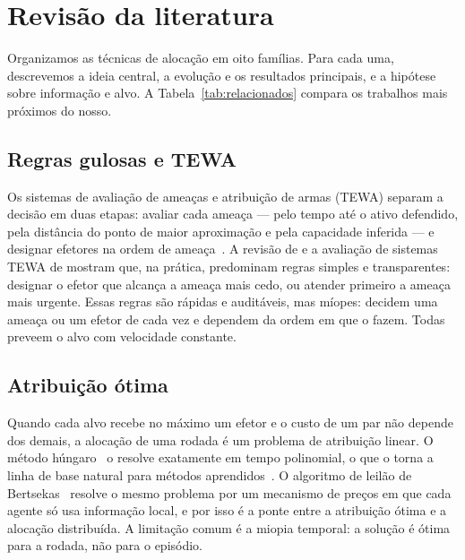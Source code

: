 \documentclass[11pt,a4paper]{article}
\begin{document}
\section{Revisão da literatura}\label{sec:revisao}

Organizamos as técnicas de alocação em oito famílias. Para cada uma, descrevemos a ideia central, a evolução e os
resultados principais, e a hipótese sobre informação e alvo. A Tabela~\ref{tab:relacionados} compara os trabalhos mais
próximos do nosso.

\subsection{Regras gulosas e TEWA}
Os sistemas de avaliação de ameaças e atribuição de armas (TEWA) separam a decisão em duas etapas: avaliar cada ameaça
--- pelo tempo até o ativo defendido, pela distância do ponto de maior aproximação e pela capacidade inferida --- e
designar efetores na ordem de ameaça~\cite{roux2007}. A revisão de \citet{roux2007} e a avaliação de sistemas TEWA de
\citet{johansson2010} mostram que, na prática, predominam regras simples e transparentes: designar o efetor que alcança
a ameaça mais cedo, ou atender primeiro a ameaça mais urgente. Essas regras são rápidas e auditáveis, mas míopes: decidem
uma ameaça ou um efetor de cada vez e dependem da ordem em que o fazem. Todas preveem o alvo com velocidade constante.

\subsection{Atribuição ótima}
Quando cada alvo recebe no máximo um efetor e o custo de um par não depende dos demais, a alocação de uma rodada é um
problema de atribuição linear. O método húngaro~\cite{kuhn1955,munkres1957} o resolve exatamente em tempo polinomial,
o que o torna a linha de base natural para métodos aprendidos~\cite{liu2023drones}. O algoritmo de leilão de
Bertsekas~\cite{bertsekas1988} resolve o mesmo problema por um mecanismo de preços em que cada agente só usa informação
local, e por isso é a ponte entre a atribuição ótima e a alocação distribuída. A limitação comum é a miopia temporal: a
solução é ótima para a rodada, não para o episódio.
\end{document}
